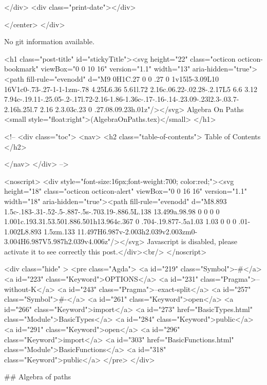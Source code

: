           
        </div>
        <div class="print-date"></div>
        
        
    </center>
  </div>

  
  No git information available.
  

  <h1 class="post-title" id="stickyTitle"><svg height="22" class="octicon octicon-bookmark" viewBox="0 0 10 16" version="1.1" width="13" aria-hidden="true"><path fill-rule="evenodd" d="M9 0H1C.27 0 0 .27 0 1v15l5-3.09L10 16V1c0-.73-.27-1-1-1zm-.78 4.25L6.36 5.61l.72 2.16c.06.22-.02.28-.2.17L5 6.6 3.12 7.94c-.19.11-.25.05-.2-.17l.72-2.16-1.86-1.36c-.17-.16-.14-.23.09-.23l2.3-.03.7-2.16h.25l.7 2.16 2.3.03c.23 0 .27.08.09.23h.01z"/></svg> Algebra On Paths <small style="float:right">(AlgebraOnPaths.tex)</small>
  </h1>

  <!-- 
  <div class="toc">
    <nav>
    <h2 class="table-of-contents"> Table of Contents </h2>
      

    </nav>
  </div>
   -->

  <noscript>
  <div style="font-size:16px;font-weight:700; color:red;"><svg height="18" class="octicon octicon-alert" viewBox="0 0 16 16" version="1.1" width="18" aria-hidden="true"><path fill-rule="evenodd" d="M8.893 1.5c-.183-.31-.52-.5-.887-.5s-.703.19-.886.5L.138 13.499a.98.98 0 0 0 0 1.001c.193.31.53.501.886.501h13.964c.367 0 .704-.19.877-.5a1.03 1.03 0 0 0 .01-1.002L8.893 1.5zm.133 11.497H6.987v-2.003h2.039v2.003zm0-3.004H6.987V5.987h2.039v4.006z"/></svg> Javascript is disabled, please activate it to see correctly this post.</div><br/>
  </noscript>

  <div class="hide" >
<pre class="Agda">
<a id="219" class="Symbol">{-#</a> <a id="223" class="Keyword">OPTIONS</a> <a id="231" class="Pragma">--without-K</a> <a id="243" class="Pragma">--exact-split</a> <a id="257" class="Symbol">#-}</a>
<a id="261" class="Keyword">open</a> <a id="266" class="Keyword">import</a> <a id="273" href="BasicTypes.html" class="Module">BasicTypes</a> <a id="284" class="Keyword">public</a>
<a id="291" class="Keyword">open</a> <a id="296" class="Keyword">import</a> <a id="303" href="BasicFunctions.html" class="Module">BasicFunctions</a> <a id="318" class="Keyword">public</a>
</pre>
</div>

## Algebra of paths

